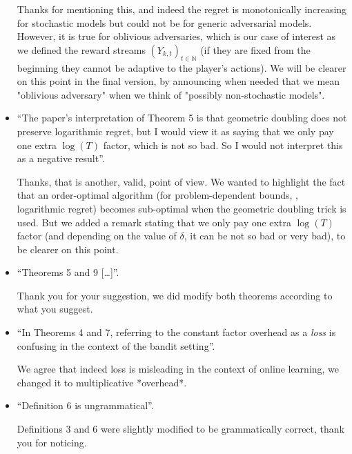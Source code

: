 \documentclass[anon,12pt]{colt2018} %
\begin{document}
\begin{itemize}
    Thanks for mentioning this, and indeed the regret is monotonically increasing for stochastic models but could not be for generic adversarial models.
    However, it is true for oblivious adversaries, which is our case of interest as we defined the reward streams $(Y_{k,t})_{t\in\mathbb{N}}$ (if they are fixed from the beginning they cannot be adaptive to the player's actions).
    We will be clearer on this point in the final version, by announcing when needed that we mean "oblivious adversary" when we think of "possibly non-stochastic models".

    \item
    ``The paper's interpretation of Theorem 5 is that geometric doubling does not preserve logarithmic regret, but I would view it as saying that we only pay one extra $\log(T)$ factor, which is not so bad. So I would not interpret this as a negative result''.

    Thanks, that is another, valid, point of view.
    We wanted to highlight the fact that an order-optimal algorithm (for problem-dependent bounds, \ie, logarithmic regret) becomes sub-optimal when the geometric doubling trick is used.
    But we added a remark stating that we only pay one extra $\log(T)$ factor (and depending on the value of $\delta$, it can be not so bad or very bad), to be clearer on this point.

    \item
    ``Theorems 5 and 9 [\ldots]''.

    Thank you for your suggestion, we did modify both theorems according to what you suggest.

    \item
    ``In Theorems 4 and 7, referring to the constant factor overhead as a \emph{loss} is confusing in the context of the bandit setting''.

    We agree that indeed loss is misleading in the context of online learning, we changed it to multiplicative *overhead*.

    \item
    ``Definition 6 is ungrammatical''.

    Definitions 3 and 6 were slightly modified to be grammatically correct, thank you for noticing.

\end{itemize}

\hr{}
\end{document}
